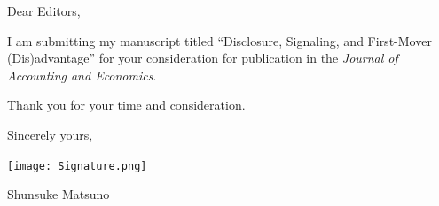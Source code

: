 \documentclass{article}
\begin{document}
Dear Editors,
\bigskip %


I am submitting my manuscript titled ``Disclosure, Signaling, and First-Mover (Dis)advantage'' for your consideration for publication in the \textit{Journal of Accounting and Economics}.

Thank you for your time and consideration.

\bigskip %

Sincerely yours,

\vspace{50pt} %

\texttt{[image: Signature.png]}


Shunsuke Matsuno
\end{document}
